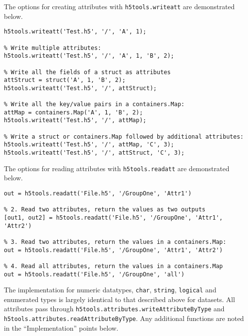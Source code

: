 \documentclass[11pt]{exam}
\newcommand\myfcn[1]{\colorbox{codegray}{\textcolor{codeblue}{\texttt{#1}}}}
\begin{document}
        The options for creating attributes with \myfcn{h5tools.writeatt} are demonstrated below. 
		\begin{lstlisting}[style=matlab-editor, basicstyle=\mlttfamily\footnotesize]
% Write a single attribute:
h5tools.writeatt('Test.h5', '/', 'A', 1);

% Write multiple attributes:
h5tools.writeatt('Test.h5', '/', 'A', 1, 'B', 2);

% Write all the fields of a struct as attributes
attStruct = struct('A', 1, 'B', 2);
h5tools.writeatt('Test.h5', '/', attStruct);

% Write all the key/value pairs in a containers.Map:
attMap = containers.Map('A', 1, 'B', 2);
h5tools.writeatt('Test.h5', '/', attMap);

% Write a struct or containers.Map followed by additional attributes:
h5tools.writeatt('Test.h5', '/', attMap, 'C', 3);
h5tools.writeatt('Test.h5', '/', attStruct, 'C', 3);
		\end{lstlisting}
        The options for reading attributes with \myfcn{h5tools.readatt}  are demonstrated below. 
		\begin{lstlisting}[style=matlab-editor, basicstyle=\mlttfamily\footnotesize]
% 1. Read a single attribute, return the value
out = h5tools.readatt('File.h5', '/GroupOne', 'Attr1')

% 2. Read two attributes, return the values as two outputs
[out1, out2] = h5tools.readatt('File.h5', '/GroupOne', 'Attr1', 'Attr2')

% 3. Read two attributes, return the values in a containers.Map:
out = h5tools.readatt('File.h5', '/GroupOne', 'Attr1', 'Attr2')

% 4. Read all attributes, return the values in a containers.Map
out = h5tools.readatt('File.h5', '/GroupOne', 'all')
		\end{lstlisting}

		\noindent The implementation for numeric datatypes, \texttt{char}, \texttt{string}, \texttt{logical} and enumerated types is largely identical to that described above for datasets. 
        All attributes pass through \myfcn{h5tools.attributes.writeAttributeByType} and \myfcn{h5tools.attributes.readAttributeByType}. Any additional functions are noted in the ``Implementation'' points below.
		
\end{document}
